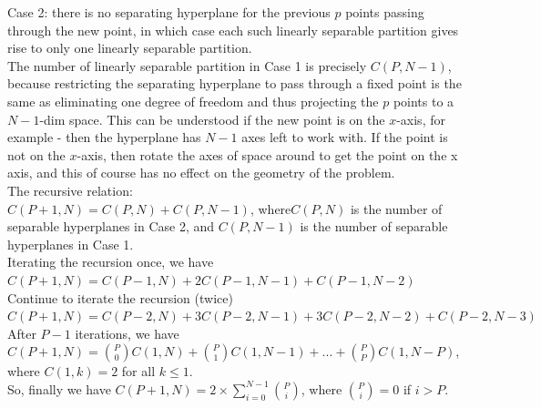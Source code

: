 \documentclass[a4paper,12pt]{article}
\begin{document}
Case 2: there is no separating hyperplane for the previous $p$ points passing through the new point, in which case each such linearly separable partition gives rise to only one linearly separable partition. \\
The number of linearly separable partition in Case 1 is precisely $C(P,N-1)$, because restricting the separating hyperplane to pass through a fixed point is the same as eliminating one degree of freedom and thus projecting the $p$ points to a $N-1$-dim space. This can be understood if the new point is on the $x$-axis, for example - then the hyperplane has $N-1$ axes left to work with. If the point is not on the $x$-axis, then rotate the axes of space around to get the point on the x axis, and this of course has no effect on the geometry of the problem. \\
The recursive relation:\\
$C(P+1,N)=C(P,N)+C(P,N-1)$, where$C(P,N)$ is the number of separable hyperplanes in Case 2, and $C(P,N-1)$
is the number of separable hyperplanes in Case 1.\\
\newline
Iterating the recursion once, we have \\
$C(P+1,N)=C(P-1,N)+2C(P-1,N-1)+C(P-1,N-2)$\\
\newline
Continue to iterate the recursion (twice)\\
$C(P+1,N)=C(P-2,N)+3C(P-2,N-1)+3C(P-2,N-2)+C(P-2,N-3)$\\
\newline
After $P-1$ iterations, we have\\
$C(P+1,N)={{P}\choose{0}}C(1,N)+ {{P}\choose{1}} C(1, N-1)+...+ {{P}\choose{P}} C(1, N-P)$, where $C(1,k)=2$ for all $k \leq 1$.\\
\newline
So, finally we have $C(P+1,N)=2\times \displaystyle \sum_{i=0}^{N-1} {{P}\choose{i}}$, where ${{P}\choose{i}}=0$
if $i>P$.

\medskip
\end{document}
